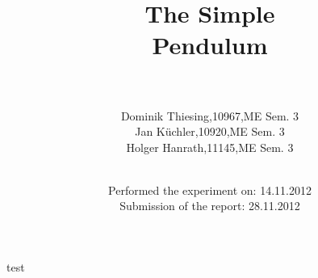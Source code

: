 \documentclass
[ a4paper, 10pt, DIV15, openany, oneside, headsepline,
footsepline,plainfootsepline,nochapterprefix,BCOR12mm,
DIVcalc,
]{scrreprt}
\newcommand{\autor}{ }
\newcommand{\titel}{The Simple\\Pendulum}
\begin{document}
\selectlanguage{\english}

\titlehead{\centering Science Lap Report}

\subject{}
\title{\titel}
\author{\begin{tabular}{p{15mm}p{41mm} p{15mm} p{25mm}}
 & \autor\\\\
 & Dominik Thiesing, & 10967,  & ME Sem. 3 \\
 & Jan K\"{u}chler,  & 10920,  & ME Sem. 3 \\
 & Holger Hanrath,   & 11145,  & ME Sem. 3 \\
\\\\
\end{tabular}}
\date{Performed the experiment on: 14.11.2012\\Submission of the report: 28.11.2012}

\publishers{
}

\maketitle

\pagebreak 

test
\end{document}
